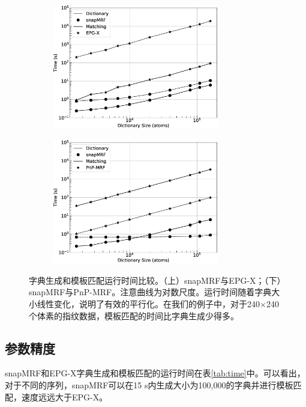 \begin{figure}
\centering
\begin{subfigure}
 \centering
 \includegraphics[width=0.8\textwidth]{img/snapmrf/time_vs_epgx.eps}
\end{subfigure}
\begin{subfigure}
 \centering
 \includegraphics[width=0.8\textwidth]{img/snapmrf/time_vs_pnp.eps}
\end{subfigure}
\caption{字典生成和模板匹配运行时间比较。（上）snapMRF与EPG-X；（下）snapMRF与PnP-MRF。注意曲线为对数尺度。运行时间随着字典大小线性变化，说明了有效的平行化。在我们的例子中，对于240$\times$240个体素的指纹数据，模板匹配的时间比字典生成少得多。}
\label{fig:time}
\end{figure}

\subsection{参数精度}
snapMRF和EPG-X字典生成和模板匹配的运行时间在表\ref{tab:time}中。可以看出，对于不同的序列，snapMRF可以在15 s内生成大小为100,000的字典并进行模板匹配，速度远远大于EPG-X。

